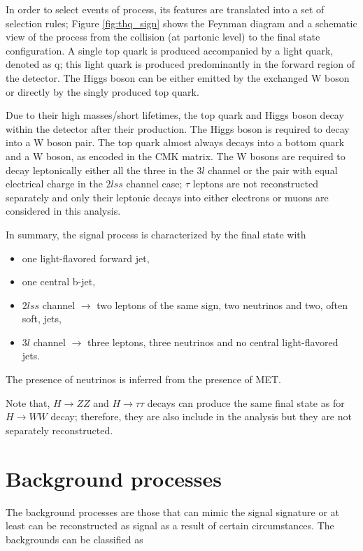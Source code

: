 In order to select events of \tHq process, its features are translated into a set of selection rules; Figure \ref{fig:thq_sign} shows the Feynman diagram and a schematic view of the \tHq process from the \pp collision (at partonic level) to the final state configuration. A single top quark is produced accompanied by a light quark, denoted as q; this light quark is produced predominantly in the forward region of the detector. The Higgs boson can be either emitted by the exchanged W boson or directly by the singly produced top quark.

Due to their high masses/short lifetimes, the top quark and Higgs boson decay within the detector after their production. The Higgs boson is required to decay into a W boson pair. The top quark almost always decays into a bottom quark and a W boson, as encoded in the CMK matrix. The W bosons are required to decay leptonically either all the three in the $3l$ channel or the pair with equal electrical charge in the $2lss$ channel case; $\tau$ leptons are not reconstructed separately and only their leptonic decays into either electrons or muons are considered in this analysis.

In summary, the signal process is characterized by the final state with

\begin{itemize}
\item one light-flavored forward jet,
\item one central b-jet,
\item $2lss$ channel $\to$ two leptons of the same sign, two neutrinos and two, often soft, jets,
\item $3l$ channel $\to$ three leptons, three neutrinos and no central light-flavored jets.
\end{itemize}

The presence of neutrinos is inferred from the presence of MET.

Note that, $H \to ZZ$ and $H\to \tau\tau$ decays can produce the same final state as for $H\to WW$ decay; therefore, they are also include in the analysis but they are not separately reconstructed.


\section{Background processes}\label{sec:bg}

The background processes are those that can mimic the signal signature or at least can be reconstructed as signal as a result of certain circumstances. The backgrounds can be classified as

